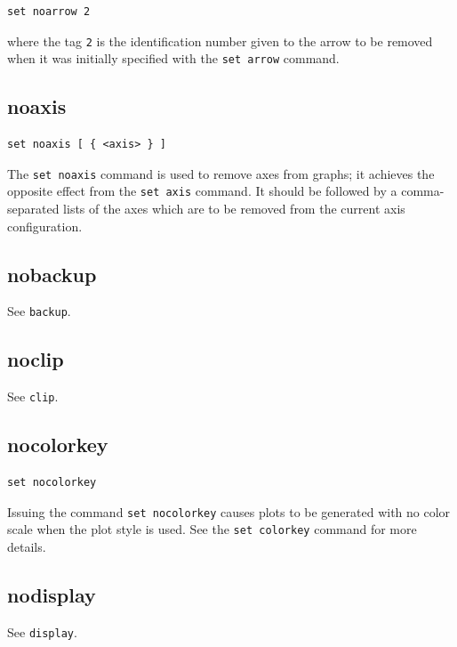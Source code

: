 \begin{verbatim}
set noarrow 2
\end{verbatim}

\noindent where the tag {\tt 2} is the identification number given to the arrow
to be removed when it was initially specified with the {\tt set arrow} command.


\subsection{noaxis}

\begin{verbatim}
set noaxis [ { <axis> } ]
\end{verbatim}

The {\tt set noaxis} command is used to remove axes from graphs; it achieves
the opposite effect from the {\tt set axis} command. It should be followed by a
comma-separated lists of the axes which are to be removed from the current axis
configuration.


\subsection{nobackup}

See {\tt backup}.


\subsection{noclip}

See {\tt clip}.


\subsection{nocolorkey}

\begin{verbatim}
set nocolorkey
\end{verbatim}

Issuing the command {\tt set nocolorkey} causes plots to be generated with no
color scale when the  plot style is used. See the {\tt set
colorkey} command for more details.


\subsection{nodisplay}

See {\tt display}.


